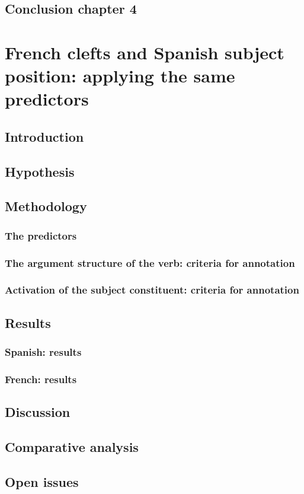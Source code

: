 \documentclass[12pt]{report}
\begin{document}
\section{Conclusion chapter 4}
\chapter{French clefts and Spanish subject position: applying the same predictors}
\section{Introduction}
\section{Hypothesis}
\section{Methodology}
\subsection{The predictors}
\subsection{The argument structure of the verb: criteria for annotation}
\subsection{Activation of the subject constituent: criteria for annotation}
\section{Results}
\subsection{Spanish: results}
\subsection{French: results}
\section{Discussion}
\section{Comparative analysis}
\section{Open issues}
\end{document}
